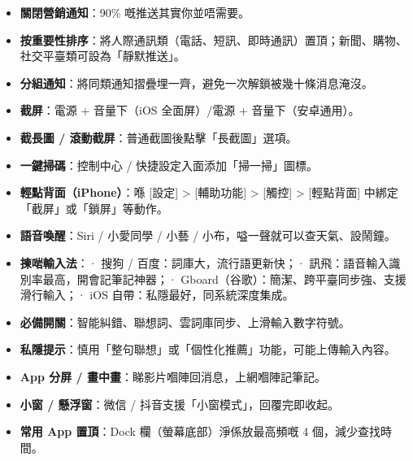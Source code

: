 
\begin{itemize}
  \item \textbf{關閉營銷通知}：90\% 嘅推送其實你並唔需要。
  \item \textbf{按重要性排序}：將人際通訊類（電話、短訊、即時通訊）置頂；新聞、購物、社交平臺類可設為「靜默推送」。
  \item \textbf{分組通知}：將同類通知摺疊埋一齊，避免一次解鎖被幾十條消息淹沒。
\end{itemize}


\begin{itemize}
  \item \textbf{截屏}：電源 + 音量下（iOS 全面屏）/電源 + 音量下（安卓通用）。
  \item \textbf{截長圖 / 滾動截屏}：普通截圖後點擊「長截圖」選項。
  \item \textbf{一鍵掃碼}：控制中心 / 快捷設定入面添加「掃一掃」圖標。
  \item \textbf{輕點背面（iPhone）}：喺 [設定] > [輔助功能] > [觸控] > [輕點背面] 中綁定「截屏」或「鎖屏」等動作。
  \item \textbf{語音喚醒}：Siri / 小愛同學 / 小藝 / 小布，嗌一聲就可以查天氣、設鬧鐘。
\end{itemize}


\begin{itemize}
  \item \textbf{揀啱輸入法}：\newline · 搜狗 / 百度：詞庫大，流行語更新快；\newline · 訊飛：語音輸入識別率最高，開會記筆記神器；\newline · Gboard（谷歌）：簡潔、跨平臺同步強、支援滑行輸入；\newline · iOS 自帶：私隱最好，同系統深度集成。
  \item \textbf{必備開關}：智能糾錯、聯想詞、雲詞庫同步、上滑輸入數字符號。
  \item \textbf{私隱提示}：慎用「整句聯想」或「個性化推薦」功能，可能上傳輸入內容。
\end{itemize}


\begin{itemize}
  \item \textbf{App 分屏 / 畫中畫}：睇影片嗰陣回消息，上網嗰陣記筆記。
  \item \textbf{小窗 / 懸浮窗}：微信 / 抖音支援「小窗模式」，回覆完即收起。
  \item \textbf{常用 App 置頂}：Dock 欄（螢幕底部）淨係放最高頻嘅 4 個，減少查找時間。
\end{itemize}

